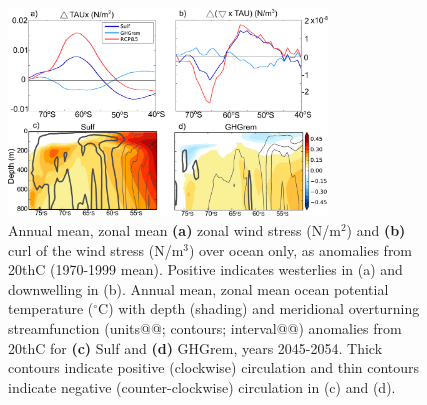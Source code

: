 \documentclass[grl]{AGUTeX}  %
\begin{document}
\begin{article}
\begin{figure}[htbp] %
\centering
 \noindent\includegraphics[width=20pc]{figures/TAUcurl_TEMPanomMOCeddy+eul.pdf}
\caption{Annual mean, zonal mean \textbf{(a)} zonal wind stress (N/m$^2$) and \textbf{(b)} curl of the wind stress (N/m$^3$) over ocean only, as anomalies from 20thC (1970-1999 mean). Positive indicates westerlies in (a) and downwelling in (b). Annual mean, zonal mean ocean potential temperature ($^\circ$C) with depth (shading) and meridional overturning streamfunction (units@@; contours; interval@@) anomalies from 20thC for \textbf{(c)} Sulf and \textbf{(d)} GHGrem, years 2045-2054. Thick contours indicate positive (clockwise) circulation and thin contours indicate negative (counter-clockwise) circulation in (c) and (d).}
\label{fig:zmtautemp}
\end{figure}


\end{article}
\end{document}
